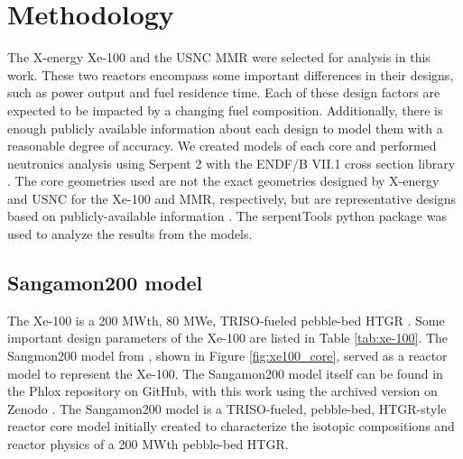 \section{Methodology}
The X-energy Xe-100 and 
the \gls*{USNC} \gls*{MMR} were selected for analysis in this work. These two reactors encompass 
some important differences in their designs, such as power output
and fuel residence time. Each of these design factors are expected to 
be impacted by a changing fuel composition. 
Additionally, there is enough publicly available information about 
each design to model them with a reasonable degree of accuracy. 
We created models of each core and performed neutronics analysis using 
Serpent 2 \cite{leppanen_serpent_2015} with the 
ENDF/B VII.1 cross section library \cite{chadwick_endfb-vii1_2011}.
The core geometries used are not 
the exact geometries designed by X-energy and \gls*{USNC} for the 
Xe-100 and \gls*{MMR}, respectively, but 
are representative designs based on publicly-available information 
\cite{mulder_overview_2021,noauthor_usnc_2021,hawari_development_2018,venneri_micro_2019}. 
The serpentTools python package \cite{johnson_serpenttools_2020} 
was used to 
analyze the results from the models.

\subsection{Sangamon200 model} \label{sec:xe100_serpent_model}
The Xe-100 is a 200 MWth, 80 MWe, \acrfull*{TRISO}-fueled pebble-bed 
\gls*{HTGR} \cite{mulder_overview_2021}. Some important design parameters 
of the Xe-100 are listed in Table \ref{tab:xe-100}. 
The Sangmon200 model from \cite{richter_isotopic_2022}, shown in 
Figure \ref{fig:xe100_core}, served as a reactor model 
to represent the Xe-100. The Sangamon200 model itself can be 
found in the Phlox repository on GitHub, with this work using 
the archived version on Zenodo \cite{richter_zoerichterphlox_2022}.
The Sangamon200 model is a \gls*{TRISO}-fueled, pebble-bed, \gls*{HTGR}-style 
reactor core model initially created to characterize the isotopic 
compositions and reactor physics of a 200 MWth pebble-bed \gls*{HTGR}. 

